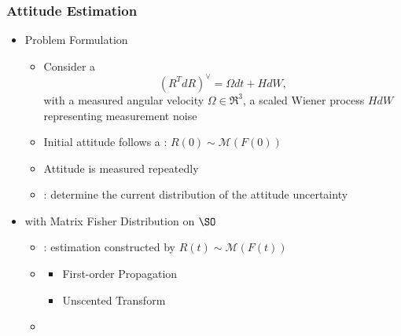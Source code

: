 \begin{frame}
\frametitle{Attitude Estimation}

\begin{itemize}
\item {} Problem Formulation
	\begin{itemize}
	\item Consider a 
	\[ (R^T dR)^\vee = \Omega dt + H dW,\]
	with a measured angular velocity $\Omega\in\Re^3$, a scaled Wiener process $HdW$ representing measurement noise
	\item Initial attitude follows a : $R(0)\sim\mathcal{M}(F(0))$
	\item Attitude is measured repeatedly
	\item {}: determine the current distribution of the attitude uncertainty
	\end{itemize}
\vspace*{0.3cm}\pause
\item {} with Matrix Fisher Distribution on $\SO$
	\begin{itemize}
	\item {}: estimation constructed by $R(t)\sim\mathcal{M}(F(t))$
	\item {}
		\begin{itemize}
		\item First-order Propagation
		\item Unscented Transform
		\end{itemize}
	\item {}
	\end{itemize}
\end{itemize}
\end{frame}
